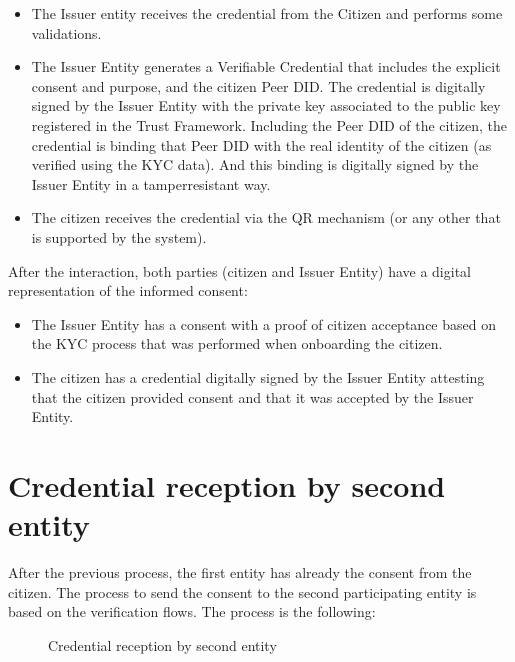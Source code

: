 \documentclass[a4paper,12pt,english,openany]{sphinxmanual}
\begin{document}
\begin{itemize}
\item {} 
\sphinxAtStartPar
The Issuer entity receives the credential from the Citizen and performs some validations.

\item {} 
\sphinxAtStartPar
The Issuer Entity generates a Verifiable Credential that includes the explicit consent and purpose, and the citizen Peer DID. The credential is digitally signed by the Issuer Entity with the private key associated to the public key registered in the Trust Framework. Including the Peer DID of the citizen, the credential is binding that Peer DID with the real identity of the citizen (as verified using the KYC data). And this binding is digitally signed by the Issuer Entity in a tamper\sphinxhyphen{}resistant way.

\item {} 
\sphinxAtStartPar
The citizen receives the credential via the QR mechanism (or any other that is supported by the system).

\end{itemize}

\sphinxAtStartPar
After the interaction, both parties (citizen and Issuer Entity) have a digital representation of the informed consent:
\begin{itemize}
\item {} 
\sphinxAtStartPar
The Issuer Entity has a consent with a proof of citizen acceptance based on the KYC process that was performed when onboarding the citizen.

\item {} 
\sphinxAtStartPar
The citizen has a credential digitally signed by the Issuer Entity attesting that the citizen provided consent and that it was accepted by the Issuer Entity.

\end{itemize}


\section{Credential reception by second entity}
\label{\detokenize{privacyconsent:credential-reception-by-second-entity}}
\sphinxAtStartPar
After the previous process, the first entity has already the consent from the citizen. The process to send the consent to the second participating entity is based on the verification flows. The process is the following:

\begin{figure}[htbp]
\centering
\capstart

\noindent{}
\caption{Credential reception by second entity}\label{\detokenize{privacyconsent:id2}}\end{figure}
\end{document}
